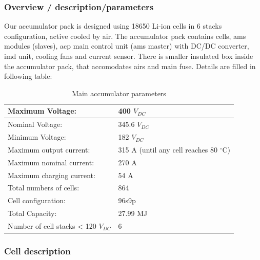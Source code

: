 \subsubsection{Overview / description/parameters}
Our accumulator pack is designed using 18650 Li-ion cells in 6 stacks configuration, active cooled by air. The accumulator pack contains cells, \gls{ams} modules (slaves), \gls{acp} main control unit (\gls{ams} master) with DC/DC converter, \gls{imd} unit, cooling fans and current sensor. There is smaller insulated box inside the accumulator pack, that accomodates \glspl{air} and main fuse.
Details are filled in following table:

\begin{table}[H]
	\centering
	\caption{Main accumulator parameters}
	\begin{tabularx}{\textwidth}{|X|X|}
		\hline
		Maximum Voltage: & 400 $V_{DC}$ \\[\TableSize]
		\hline
		Nominal Voltage: & 345.6 $V_{DC}$ \\[\TableSize]
		\hline
		Minimum Voltage: & 182 $V_{DC}$ \\[\TableSize]
		\hline
		Maximum output current: & 315 A (until any cell reaches 80 $^\circ$C) \\[\TableSize]
		\hline
		Maximum nominal current: & 270 A \\[\TableSize]
		\hline
		Maximum charging current: & 54 A \\[\TableSize]
		\hline
		Total numbers of cells: & 864 \\[\TableSize]
		\hline
		Cell configuration: & 96s9p \\[\TableSize]
		\hline
		Total Capacity: & 27.99 MJ \\[\TableSize]
		\hline
		Number of cell stacks < 120 $V_{DC}$ & 6 \\[\TableSize]
		\hline
	\end{tabularx}%
	\label{tab:acc-main}%
\end{table}%

\subsubsection{Cell description}

